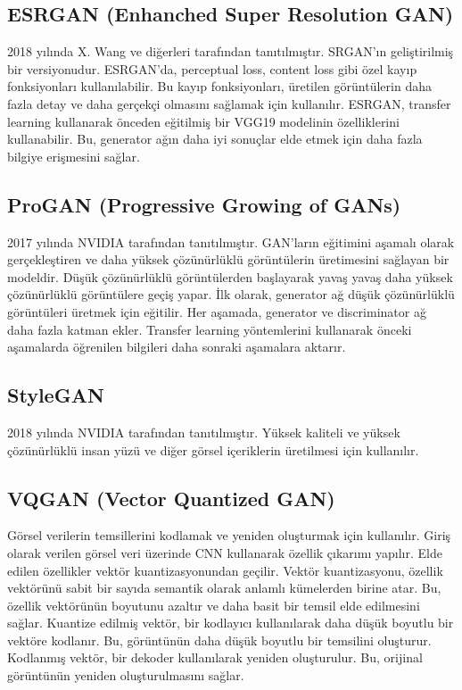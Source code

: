 \subsection{ESRGAN (Enhanched Super Resolution GAN)}
2018 yılında X. Wang ve diğerleri tarafından tanıtılmıştır. SRGAN'ın geliştirilmiş bir versiyonudur. ESRGAN'da, perceptual loss, content loss gibi özel kayıp fonksiyonları kullanılabilir. Bu kayıp fonksiyonları, üretilen görüntülerin daha fazla detay ve daha gerçekçi olmasını sağlamak için kullanılır. ESRGAN, transfer learning kullanarak önceden eğitilmiş bir VGG19 modelinin özelliklerini kullanabilir. Bu, generator ağın daha iyi sonuçlar elde etmek için daha fazla bilgiye erişmesini sağlar.

\subsection{ProGAN (Progressive Growing of GANs)}
2017 yılında NVIDIA tarafından tanıtılmıştır. GAN'ların eğitimini aşamalı olarak gerçekleştiren ve daha yüksek çözünürlüklü görüntülerin üretimesini sağlayan bir modeldir. Düşük çözünürlüklü görüntülerden başlayarak yavaş yavaş daha yüksek çözünürlüklü görüntülere geçiş yapar. İlk olarak, generator ağ düşük çözünürlüklü görüntüleri üretmek için eğitilir. Her aşamada, generator ve discriminator ağ daha fazla katman ekler. Transfer learning yöntemlerini kullanarak önceki aşamalarda öğrenilen bilgileri daha sonraki aşamalara aktarır.

\subsection{StyleGAN}
2018 yılında NVIDIA tarafından tanıtılmıştır. Yüksek kaliteli ve yüksek çözünürlüklü insan yüzü ve diğer görsel içeriklerin üretilmesi için kullanılır.

\subsection{VQGAN (Vector Quantized GAN)}
Görsel verilerin temsillerini kodlamak ve yeniden oluşturmak için kullanılır. Giriş olarak verilen görsel veri üzerinde CNN kullanarak özellik çıkarımı yapılır. Elde edilen özellikler vektör kuantizasyonundan geçilir. Vektör kuantizasyonu, özellik vektörünü sabit bir sayıda semantik olarak anlamlı kümelerden birine atar. Bu, özellik vektörünün boyutunu azaltır ve daha basit bir temsil elde edilmesini sağlar. Kuantize edilmiş vektör, bir kodlayıcı kullanılarak daha düşük boyutlu bir vektöre kodlanır. Bu, görüntünün daha düşük boyutlu bir temsilini oluşturur. Kodlanmış vektör, bir dekoder kullanılarak yeniden oluşturulur. Bu, orijinal görüntünün yeniden oluşturulmasını sağlar. 

